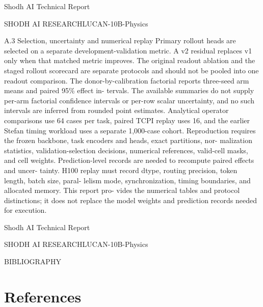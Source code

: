 \documentclass[11pt]{article}
\begin{document}
\noindent Shodh AI Technical Report\par




\noindent SHODH AI RESEARCH\quad LUCAN-10B-Physics\par



A.3 Selection, uncertainty and numerical replay
Primary rollout heads are selected on a separate development-validation metric. A v2
residual replaces v1 only when that matched metric improves. The original readout ablation
and the staged rollout scorecard are separate protocols and should not be pooled into one
readout comparison.
The donor-by-calibration factorial reports three-seed arm means and paired 95\% effect in-
tervals. The available summaries do not supply per-arm factorial confidence intervals or
per-row scalar uncertainty, and no such intervals are inferred from rounded point estimates.
Analytical operator comparisons use 64 cases per task, paired TCPI replay uses 16, and the
earlier Stefan timing workload uses a separate 1,000-case cohort.
Reproduction requires the frozen backbone, task encoders and heads, exact partitions, nor-
malization statistics, validation-selection decisions, numerical references, valid-cell masks,
and cell weights. Prediction-level records are needed to recompute paired effects and uncer-
tainty. H100 replay must record dtype, routing precision, token length, batch size, paral-
lelism mode, synchronization, timing boundaries, and allocated memory. This report pro-
vides the numerical tables and protocol distinctions; it does not replace the model weights
and prediction records needed for execution.





\noindent Shodh AI Technical Report\par




\noindent SHODH AI RESEARCH\quad LUCAN-10B-Physics\par



BIBLIOGRAPHY


\section*{References}
\end{document}
